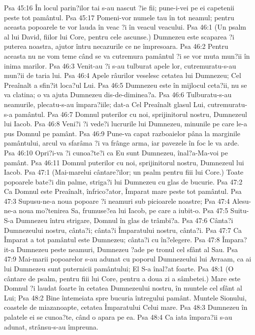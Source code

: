 Psa 45:16  În locul parin?ilor tai s-au nascut ?ie fii; pune-i-vei pe ei capetenii peste tot pamântul.
Psa 45:17  Pomeni-vor numele tau în tot neamul; pentru aceasta popoarele te vor lauda în veac ?i în veacul veacului.
Psa 46:1  (Un psalm al lui David, fiilor lui Core, pentru cele ascunse.) Dumnezeu este scaparea ?i puterea noastra, ajutor întru necazurile ce ne împresoara.
Psa 46:2  Pentru aceasta nu ne vom teme când se va cutremura pamântul ?i se vor muta mun?ii în inima marilor.
Psa 46:3  Venit-au ?i s-au tulburat apele lor, cutremuratu-s-au mun?ii de taria lui.
Psa 46:4  Apele râurilor veselesc cetatea lui Dumnezeu; Cel Preaînalt a sfin?it loca?ul Lui.
Psa 46:5  Dumnezeu este în mijlocul ceta?ii, nu se va clatina; o va ajuta Dumnezeu dis-de-diminea?a.
Psa 46:6  Tulburatu-s-au neamurile, plecatu-s-au împara?iile; dat-a Cel Preaînalt glasul Lui, cutremuratu-s-a pamântul.
Psa 46:7  Domnul puterilor cu noi, sprijinitorul nostru, Dumnezeul lui Iacob.
Psa 46:8  Veni?i ?i vede?i lucrurile lui Dumnezeu, minunile pe care le-a pus Domnul pe pamânt.
Psa 46:9  Pune-va capat razboaielor pâna la marginile pamântului, arcul va sfarâma ?i va frânge arma, iar pavezele în foc le va arde.
Psa 46:10  Opri?i-va ?i cunoa?te?i ca Eu sunt Dumnezeu, înal?a-Ma-voi pe pamânt.
Psa 46:11  Domnul puterilor cu noi, sprijinitorul nostru, Dumnezeul lui Iacob.
Psa 47:1  (Mai-marelui cântare?ilor; un psalm pentru fiii lui Core.) Toate popoarele bate?i din palme, striga?i lui Dumnezeu cu glas de bucurie.
Psa 47:2  Ca Domnul este Preaînalt, înfrico?ator, Împarat mare peste tot pamântul.
Psa 47:3  Supusu-ne-a noua popoare ?i neamuri sub picioarele noastre;
Psa 47:4  Alesu-ne-a noua mo?tenirea Sa, frumuse?ea lui Iacob, pe care a iubit-o.
Psa 47:5  Suitu-S-a Dumnezeu întru strigare, Domnul în glas de trâmbi?a.
Psa 47:6  Cânta?i Dumnezeului nostru, cânta?i; cânta?i Împaratului nostru, cânta?i.
Psa 47:7  Ca Împarat a tot pamântul este Dumnezeu; cânta?i cu în?elegere.
Psa 47:8  Împara?it-a Dumnezeu peste neamuri, Dumnezeu ?ade pe tronul cel sfânt al Sau.
Psa 47:9  Mai-marii popoarelor s-au adunat cu poporul Dumnezeului lui Avraam, ca ai lui Dumnezeu sunt puternicii pamântului; El S-a înal?at foarte.
Psa 48:1  (O cântare de psalm, pentru fiii lui Core, pentru a doua zi a sâmbetei.) Mare este Domnul ?i laudat foarte în cetatea Dumnezeului nostru, în muntele cel sfânt al Lui;
Psa 48:2  Bine întemeiata spre bucuria întregului pamânt. Muntele Sionului, coastele de miazanoapte, cetatea Împaratului Celui mare.
Psa 48:3  Dumnezeu în palatele ei se cunoa?te, când o apara pe ea.
Psa 48:4  Ca iata împara?ii s-au adunat, strânsu-s-au împreuna.
